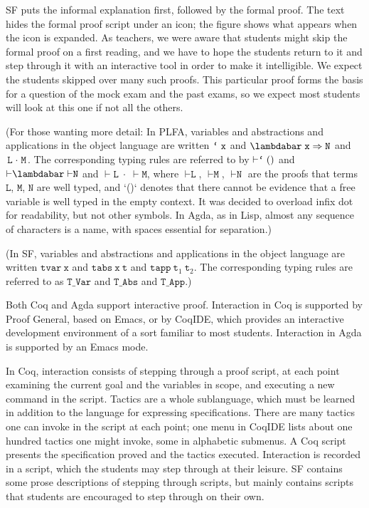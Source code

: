 \documentclass[preprint,authoryear]{elsarticle}
\begin{document}
SF puts the informal explanation first, followed by the formal proof. The text
hides the formal proof script under an icon; the figure shows what appears when
the icon is expanded. As teachers, we were aware that students might skip the
formal proof on a first reading, and we have to hope the students 
return to it and step through it with an interactive tool in order to make it
intelligible.  We expect the students skipped over many such proofs.  This
particular proof forms the basis for a question of the mock exam and the past
exams, so we expect most students will look at this one if not all the
others.

\newcommand{\ex}{\texttt{x}}
\newcommand{\why}{\texttt{y}}
\newcommand{\EL}{\texttt{L}}
\newcommand{\EM}{\texttt{M}}
\newcommand{\EN}{\texttt{N}}
\newcommand{\tee}{\texttt{t}}
\newcommand{\tick}{\texttt{\lq}}
\newcommand{\GG}{\Gamma}
\newcommand{\AY}{\texttt{A}}
\newcommand{\BE}{\texttt{B}}

(For those wanting more detail: In PLFA, variables and abstractions and
applications in the object language are written $\tick\;\ex$ and
$\lambdabar\;\ex\;{\Rightarrow}\;\EN$ and $\EL\;{\cdot}\;\EM$.  The
corresponding typing rules are referred to by ${\vdash}\tick\;()$
and ${\vdash}\lambdabar\;{\vdash}\EN$ and ${\vdash}\EL\;{\cdot}\;{\vdash}\EM$, where
${\vdash}\EL$, ${\vdash}\EM$, ${\vdash}\EN$ are the proofs that terms
$\EL$, $\EM$, $\EN$ are well typed, and `()` denotes that there cannot
be evidence that a free variable is well typed in the empty context.
It was decided to overload infix dot for readability, but not other
symbols. In Agda, as in Lisp, almost any sequence of characters is a
name, with spaces essential for separation.)

(In SF, variables and abstractions and applications in
the object language are written $\texttt{tvar}~\ex$ and
$\texttt{tabs}~\ex~\tee$ and $\texttt{tapp}~\tee_1~\tee_2$.
The corresponding typing rules are referred to as
$\texttt{T\_Var}$ and $\texttt{T\_Abs}$ and $\texttt{T\_App}$.)

Both Coq and Agda support interactive proof.  Interaction in Coq is
supported by Proof General, based on Emacs, or by CoqIDE, which
provides an interactive development environment of a sort familiar to
most students.  Interaction in Agda is supported by an Emacs mode.

In Coq, interaction consists of stepping through a proof script, at
each point examining the current goal and the variables in
scope, and executing a new command in the script.  Tactics are a whole
sublanguage, which must be learned in addition to the language for
expressing specifications.  There are many tactics one can invoke in
the script at each point; one menu in CoqIDE lists about one hundred
tactics one might invoke, some in alphabetic submenus.  A Coq
script presents the specification proved and the tactics executed.
Interaction is recorded in a script, which the students
may step through at their leisure.  SF contains some prose descriptions
of stepping through scripts, but mainly contains scripts that students
are encouraged to step through on their own.
\end{document}
